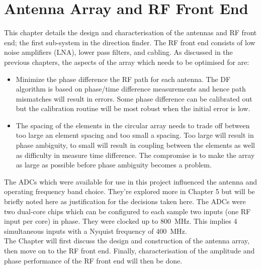 \chapter{Antenna Array and RF Front End}
\label{ch:rf-front-end}
\graphicspath{{./img/rf-front-end/}}

This chapter details the design and characterisation of the antennas and RF front end; the first sub-system in the direction finder. The RF front end consists of low noise amplifiers (LNA), lower pass filters, and cabling. As discussed in the previous chapters, the aspects of the array which needs to be optimised for are:
\begin{itemize}
  \item Minimize the phase difference the RF path for each antenna. The DF algorithm is based on phase/time difference measurements and hence path mismatches will result in errors. Some phase difference can be calibrated out but the calibration routine will be most robust when the initial error is low.
  \item The spacing of the elements in the circular array needs to trade off between too large an element spacing and too small a spacing. Too large will result in phase ambiguity, to small will result in coupling between the elements as well as difficulty in measure time difference. The compromise is to make the array as large as possible before phase ambiguity becomes a problem.
\end{itemize}

The ADCs which were available for use in this project influenced the antenna and operating frequency band choice. They're explored more in Chapter 5 but will be briefly noted here as justification for the decisions taken here. The ADCs were two dual-core chips which can be configured to each sample two inputs (one RF input per core) in phase. They were clocked up to \SI{800}{\mega\hertz}. This implies 4 simultaneous inputs with a Nyquist frequency of \SI{400}{\mega\hertz}.\\

The Chapter will first discuss the design and construction of the antenna array, then move on to the RF front end. Finally, characterisation of the amplitude and phase performance of the RF front end will then be done. 






